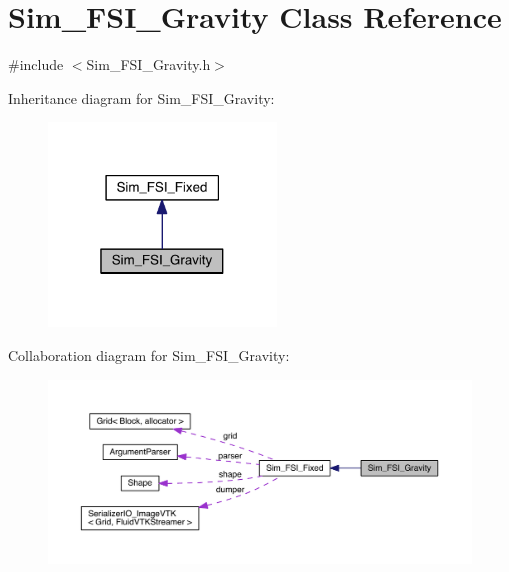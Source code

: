 \hypertarget{class_sim___f_s_i___gravity}{}\section{Sim\+\_\+\+F\+S\+I\+\_\+\+Gravity Class Reference}
\label{class_sim___f_s_i___gravity}


{\ttfamily \#include $<$Sim\+\_\+\+F\+S\+I\+\_\+\+Gravity.\+h$>$}



Inheritance diagram for Sim\+\_\+\+F\+S\+I\+\_\+\+Gravity\+:\nopagebreak
\begin{figure}[H]
\begin{center}
\leavevmode
\includegraphics[width=172pt]{df/d74/class_sim___f_s_i___gravity__inherit__graph}
\end{center}
\end{figure}


Collaboration diagram for Sim\+\_\+\+F\+S\+I\+\_\+\+Gravity\+:\nopagebreak
\begin{figure}[H]
\begin{center}
\leavevmode
\includegraphics[width=350pt]{d8/d6b/class_sim___f_s_i___gravity__coll__graph}
\end{center}
\end{figure}
